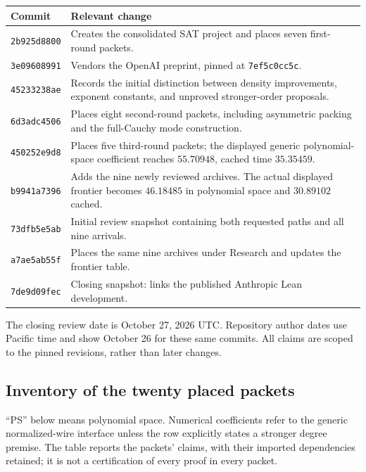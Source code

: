 \begin{center}\small
\begin{tabular}{p{3.0cm}p{10.8cm}}
\toprule Commit & Relevant change\\\midrule
\texttt{2b925d8800} & Creates the consolidated SAT project and places seven first-round packets.\\
\texttt{3e09608991} & Vendors the OpenAI preprint, pinned at \texttt{7ef5c0cc5c}.\\
\texttt{45233238ae} & Records the initial distinction between density improvements, exponent constants, and unproved stronger-order proposals.\\
\texttt{6d3adc4506} & Places eight second-round packets, including asymmetric packing and the full-Cauchy mode construction.\\
\texttt{450252e9d8} & Places five third-round packets; the displayed generic polynomial-space coefficient reaches $55.70948$, cached time $35.35459$.\\
\texttt{b9941a7396} & Adds the nine newly reviewed archives. The actual displayed frontier becomes $46.18485$ in polynomial space and $30.89102$ cached.\\
\texttt{73dfb5e5ab} & Initial review snapshot containing both requested paths and all nine arrivals.\\
\texttt{a7ae5ab55f} & Places the same nine archives under Research and updates the frontier table.\\
\texttt{7de9d09fec} & Closing snapshot: links the published Anthropic Lean development.\\
\bottomrule
\end{tabular}
\end{center}

The closing review date is October 27, 2026 UTC. Repository author dates
use Pacific time and show October 26 for these same commits. All claims
are scoped to the pinned revisions, rather than later changes.

\subsection{Inventory of the twenty placed packets}

``PS'' below means polynomial space. Numerical coefficients refer to the
generic normalized-wire interface unless the row explicitly states a
stronger degree premise. The table reports the packets' claims, with
their imported dependencies retained; it is not a certification of every
proof in every packet.

